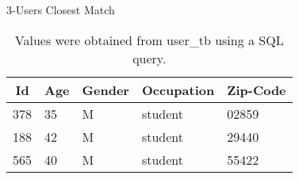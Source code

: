 \begin{table}[!htbp]
	\caption{3-Users Closest Match} \label{tab:close-match}
	\begin{center}
	\vspace{-5mm}
		\begin{tabular}{ l l l l l }
			\hline
			\multicolumn{1}{c}{Id} & \multicolumn{1}{c}{Age} & \multicolumn{1}{c}{Gender} & \multicolumn{1}{c}{Occupation} & \multicolumn{1}{c}{Zip-Code}\\
			\hline
			378 & 35 & M & student & 02859\\
			188 & 42 & M & student & 29440\\
			565 & 40 & M & student & 55422\\
			\hline
		\end{tabular}
	\caption*{\scriptsize Values were obtained from user\_tb using a SQL query.}
	 \end{center}
\end{table}